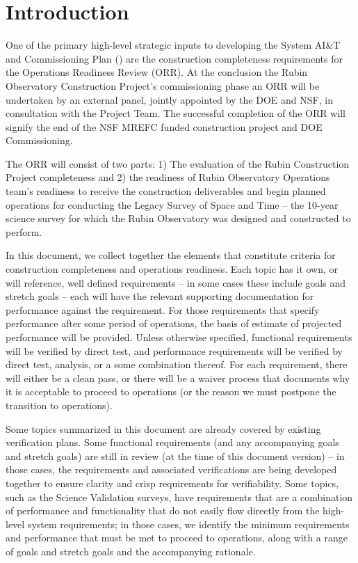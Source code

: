 
\section {Introduction}

One of the primary high-level strategic inputs to developing the System AI\&T and Commissioning Plan () are the construction completeness requirements for the Operations Readiness Review (ORR). At the conclusion the Rubin Observatory Construction Project's commissioning phase an ORR will be undertaken by an external panel, jointly appointed by the DOE and NSF, in consultation with the Project Team. The successful completion of the ORR will signify the end of the NSF MREFC funded construction project and DOE Commissioning.

The ORR will consist of two parts: 1) The evaluation of the Rubin Construction Project completeness and 2) the readiness of Rubin Observatory Operations team's readiness to receive the construction deliverables and begin planned operations for conducting the Legacy Survey of Space and Time -- the 10-year science survey for which the Rubin Observatory was designed and constructed to perform.

In this document, we collect together the elements that constitute criteria for construction completeness and operations readiness. Each topic has it own, or will reference, well defined requirements -- in some cases these include goals and stretch goals -- each will have the relevant supporting documentation for performance against the requirement. For those requirements that specify performance after some period of operations, the basis of estimate of projected performance will be provided. Unless otherwise specified, functional requirements will be verified by direct test, and performance requirements will be verified by direct test, analysis, or a some combination thereof.  For each requirement, there will either be a clean pass, or there will be a waiver process that documents why it is acceptable to proceed to operations (or the reason we must postpone the transition to operations).

Some topics summarized in this document are already covered by existing verification plans.  Some functional requirements (and any accompanying goals and stretch goals) are still in review (at the time of this document version) -- in those cases, the requirements and associated verifications are being developed together to ensure clarity and crisp requirements for verifiability. Some topics, such as the Science Validation surveys, have requirements that are a combination of performance and functionality that do not easily flow directly from the high-level system requirements; in those cases, we identify the minimum requirements and performance that must be met to proceed to operations, along with a range of goals and stretch goals and the accompanying rationale.